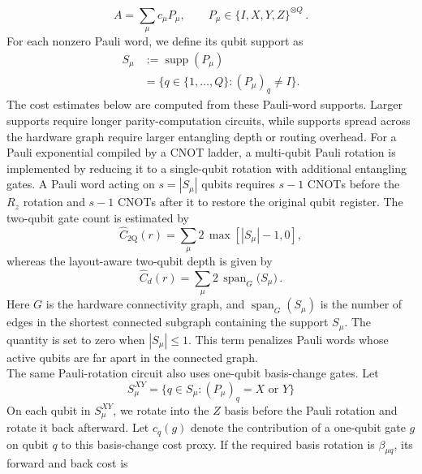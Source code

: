 \documentclass[
  reprint,
  amsmath,
  amssymb,
  aps,
  pra,
  nofootinbib,
  superscriptaddress,
  floatfix
]{revtex4-2}
\newcommand{\twq}{\mathrm{2Q}}
\begin{document}
\begin{equation}
A=\sum_{\mu}c_{\mu}P_{\mu}, \qquad P_{\mu}\in\{I,X,Y,Z\}^{\otimes Q}\,.
\label{eq:pauli_expansion}
\end{equation}
%
For each nonzero Pauli word, we define its qubit support as
%
\begin{equation}
\begin{aligned}
S_{\mu}
&:=\operatorname{supp}(P_{\mu}) \\
&=\{q\in\{1,\ldots,Q\}:(P_{\mu})_q\ne I\}.
\end{aligned}
\label{eq:pauli_word_support}
\end{equation}
%
The cost estimates below are computed from these Pauli-word supports. Larger supports require longer parity-computation circuits, while supports spread across the hardware graph require larger entangling depth or routing overhead. For a Pauli exponential compiled by a CNOT ladder, a multi-qubit Pauli rotation is implemented by reducing it to a single-qubit rotation with additional entangling gates. A Pauli word acting on \(s=|S_{\mu}|\) qubits requires \(s-1\) \textsc{CNOT}s before the \(R_z\) rotation and \(s-1\) \textsc{CNOT}s after it to restore the original qubit register. The two-qubit gate count is estimated by
%
\begin{equation*}
\widehat C_{\twq}(r)=\sum_{\mu}2\,\max[|S_{\mu}|-1, 0],
\end{equation*}
whereas the layout-aware two-qubit depth is given by
\begin{equation*}
\widehat C_d(r)=\sum_{\mu}2\,\operatorname{span}_{G}
\bigl(S_{\mu}\bigr)\,.
\end{equation*}
Here \(G\) is the hardware connectivity graph, and $\operatorname{span}_{G}(S_{\mu})$ is the number of edges in the shortest connected subgraph containing the support \(S_{\mu}\). The quantity is set to zero when $|S_{\mu}|\le1$. This term penalizes Pauli words whose active qubits are far apart in the connected graph.\\
\noindent
The same Pauli-rotation circuit also uses one-qubit basis-change gates. Let
\[
S_{\mu}^{XY} = \{q\in S_{\mu}:(P_{\mu})_q = X\text{ or }Y\}
\]
On each qubit in \(S_{\mu}^{XY}\), we rotate into the \(Z\) basis before the Pauli rotation and rotate it back afterward. Let \(c_q(g)\) denote the contribution of a one-qubit gate \(g\) on qubit \(q\) to this basis-change cost proxy. If the required basis rotation is $\beta_{\mu q}$, its forward and back cost is
\end{document}
